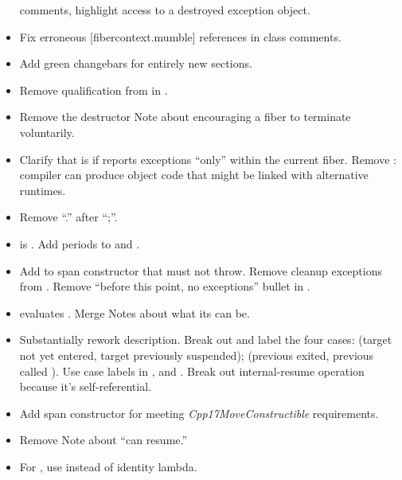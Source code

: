 \begin{itemize}
          comments, highlight access to a destroyed exception object.
    \item Fix erroneous [fibercontext.mumble] references in class comments.
    \item Add green changebars for entirely new sections.
    \item Remove  qualification from  in \effects.
    \item Remove the destructor Note about encouraging a fiber to terminate
          voluntarily.
    \item Clarify that  is \true if
          \curex reports exceptions ``only'' within the current fiber.
          Remove : compiler can produce object code that might
          be linked with alternative runtimes.
    \item Remove ``.'' after ``;''.
    \item \resumewith\xspace\mandates\xspace{} is \true.
          Add periods to \mandates and \precond.
    \item Add \precond to span constructor that  must not throw.
          Remove cleanup exceptions from \resumewith \xspace \except. Remove
          ``before this point, no exceptions'' bullet in \effects.\
    \item \resumewith evaluates . Merge Notes about what
          its \cpp{returned} can be.
    \item Substantially rework \resumewith description. Break out and label
          the four cases: (target not yet entered, target previously
          suspended); (previous exited, previous called \resumewith). Use case
          labels in \effects, \returns and \except. Break out internal-resume
          operation because it's self-referential.
    \item Add span constructor \precond for 
          meeting \emph{Cpp17MoveConstructible} requirements.
    \item Remove \canresume Note about ``can resume.''
    \item For \resume, use  instead of identity lambda.
\end{itemize}


